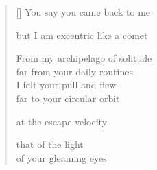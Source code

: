 \documentclass[11pt,a4paper]{article}
\begin{document}
\thispagestyle{empty}

\poemtitle{}

\settowidth{\versewidth}{From my archipelago of solitude}

\bigskip

\begin{verse}[\versewidth]
  You say you came back to me

  but I am excentric like a comet

  From my archipelago of solitude \\
  far from your daily routines\\
  I felt your pull and flew\\
  far to your circular orbit

  at the escape velocity

  that of the light \\
  of your gleaming eyes

\end{verse}
\end{document}
